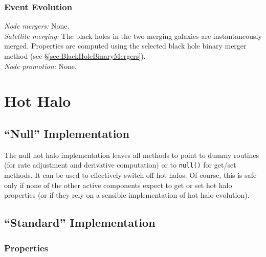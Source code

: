 \subsubsection{Event Evolution}

\noindent\emph{Node mergers:} None.\\

\noindent\emph{Satellite merging:} The black holes in the two merging galaxies are instantaneously merged. Properties are computed using the selected black hole binary merger method (see \S\ref{sec:BlackHoleBinaryMergers}).\\

\noindent\emph{Node promotion:} None.\\

\section{Hot Halo}

\subsection{``Null'' Implementation}

The null hot halo implementation leaves all methods to point to dummy routines (for rate adjustment and derivative computation) or to {\tt null()} for get/set methods. It can be used to effectively switch off hot halos. Of course, this is safe only if none of the other active components expect to get or set hot halo properties (or if they rely on a sensible implementation of hot halo evolution).

\subsection{``Standard'' Implementation}

\subsubsection{Properties}

